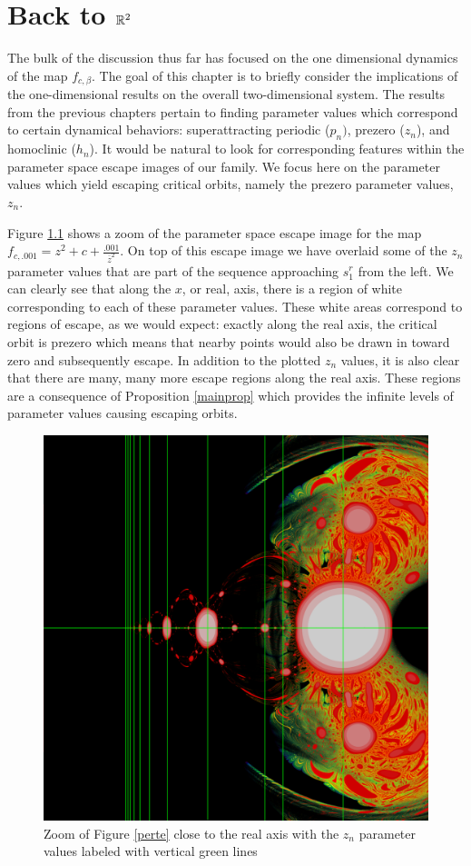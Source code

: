 \chapter{Back to $\mathbb{R}^2$}

The bulk of the discussion thus far has focused on the one dimensional dynamics of the map $f_{c, \beta}$. The goal of this chapter is to briefly consider the implications of the one-dimensional results on the overall two-dimensional system. The results from the previous chapters pertain to finding parameter values which correspond to certain dynamical behaviors: superattracting periodic ($p_n)$, prezero ($z_n$), and homoclinic ($h_n$). It would be natural to look for corresponding features within the parameter space escape images of our family. We focus here on the parameter values which yield escaping critical orbits, namely the prezero parameter values, $z_n$.

Figure \ref{par} shows a zoom of the parameter space escape image for the map $f_{c,.001} = z^2 + c + \frac{.001}{\overline{z}^2}$. On top of this escape image we have overlaid some of the $z_n$ parameter values that are part of the sequence approaching $s_1^r$ from  the left. We can clearly see that along the $x$, or real, axis, there is a region of white corresponding to each of these parameter values. These white areas correspond to regions of escape, as we would expect: exactly along the real axis, the critical orbit is prezero which means that nearby points would also be drawn in toward zero and subsequently escape. In addition to the plotted $z_n$ values, it is also clear that there are many, many more escape regions along the real axis. These regions are a consequence of Proposition \ref{mainprop} which provides the infinite levels of parameter values causing escaping orbits. 


\begin{figure}[H]
	\centering
	\includegraphics[width=.7\textwidth]{./img/par}
	\caption{Zoom of Figure \ref{perte} close to the real axis with the $z_n$ parameter values labeled with vertical green lines}
	\label{par}
\end{figure}

